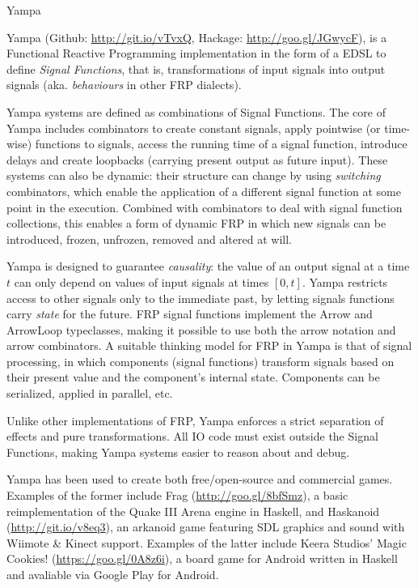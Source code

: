 \begin{hcarentry}[updated]{Yampa}
\label{yampa}
\makeheader

Yampa (Github: \href{http://git.io/vTvxQ}{http://git.io/vTvxQ}, Hackage:
\href{http://goo.gl/JGwycF}{http://goo.gl/JGwycF}), is a Functional Reactive
Programming implementation in the form of a EDSL to define \emph{Signal
Functions}, that is, transformations of input signals into output signals (aka.
\emph{behaviours} in other FRP dialects). 

Yampa systems are defined as combinations of Signal Functions. The core of
Yampa includes combinators to create constant signals, apply  pointwise (or
time-wise) functions to signals, access the running time of a signal function,
introduce delays and create loopbacks (carrying present output as future
input). These systems can also be dynamic: their structure can change by using
\emph{switching} combinators, which enable the application of a different
signal function at some point in the execution. Combined with combinators to
deal with signal function collections, this enables a form of dynamic FRP in
which new signals can be introduced, frozen, unfrozen, removed and altered at
will.

Yampa is designed to guarantee \emph{causality}: the value of an output signal
at a time $t$ can only depend on values of input signals at times $[0,t]$.
Yampa restricts access to other signals only to the immediate past, by letting
signals functions carry \emph{state} for the future.  FRP signal functions
implement the Arrow and ArrowLoop typeclasses, making it possible to
use both the arrow notation and arrow combinators. A suitable thinking model
for FRP in Yampa is that of signal processing, in which components (signal
functions) transform signals based on their present value and the component's
internal state. Components can be serialized, applied in parallel, etc.

Unlike other implementations of FRP, Yampa enforces a strict separation of
effects and pure transformations. All IO code must exist outside the Signal
Functions, making Yampa systems easier to reason about and debug.

Yampa has been used to create both free/open-source and commercial games.
Examples of the former include Frag (\href{http://goo.gl/8bfSmz}{http://goo.gl/8bfSmz}), a basic
reimplementation of the Quake III Arena engine in Haskell, and Haskanoid
(\href{http://git.io/v8eq3}{http://git.io/v8eq3}), an arkanoid game featuring
SDL graphics and sound with Wiimote \& Kinect support. Examples of the latter
include Keera Studios' Magic Cookies!
(\href{https://goo.gl/0A8z6i}{https://goo.gl/0A8z6i}), a board game for Android
written in Haskell and avaliable via Google Play for Android.


\end{hcarentry}
